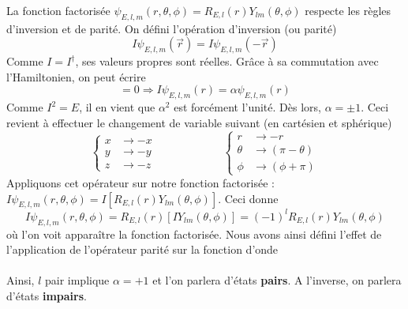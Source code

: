 La fonction factorisée $\psi_{E,l,m}(r,\theta,\phi) = R_{E,l}(r)Y_{lm}(\theta,\phi)$ respecte les règles 
d'inversion et de parité. On défini l'opération d'inversion (ou parité)
\begin{equation}
I\psi_{E,l,m}(\vec{r}) = I\psi_{E,l,m}(-\vec{r})
\end{equation}
Comme $I = I^\dagger$, ses valeurs propres sont réelles. Grâce à sa commutation avec l'Hamiltonien, on peut
écrire
\begin{equation}
[H,I]=0\Rightarrow I\psi_{E,l,m}(r)=\alpha\psi_{E,l,m}(r)
\end{equation}
Comme $I^2=E$, il en vient que $\alpha^2$ est forcément l'unité. Dès lors, $\alpha = \pm1$. Ceci revient à 
effectuer le changement de variable suivant (en cartésien et sphérique)
\begin{equation}
\left\{\begin{array}{ll}
x &\to -x\\
y &\to -y\\
z &\to -z
\end{array}\right. \qquad\qquad\qquad\left\{\begin{array}{ll}
r &\to -r\\
\theta &\to (\pi-\theta)\\
\phi &\to (\phi+\pi)
\end{array}\right. 
\end{equation}
Appliquons cet opérateur sur notre fonction factorisée :$I\psi_{E,l,m}(r,\theta,\phi) = I[R_{E,l}(r)Y_{lm}(\theta,
\phi)]$. Ceci donne
\begin{equation}
I\psi_{E,l,m}(r,\theta,\phi) = R_{E,l}(r)[IY_{lm}(\theta,\phi)] = (-1)^lR_{E,l}(r)Y_{lm}(\theta,\phi)
\end{equation}
où l'on voit apparaître la fonction factorisée. Nous avons ainsi défini l'effet de l'application de l'opérateur
parité sur la fonction d'onde \\

\ \\

Ainsi, $l$ pair implique $\alpha=+1$ et l'on parlera d'états \textbf{pairs}. A l'inverse, on parlera d'états
\textbf{impairs}.




